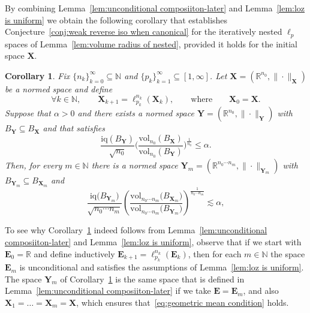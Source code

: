 \documentclass[11pt,reqno]{amsart}
\renewcommand{\le}{\leqslant}
\newcommand{\X}{\mathbf X}
\newcommand{\Y}{\mathbf Y}
\newcommand{\R}{\mathbb R}
\newtheorem{corollary}[theorem]{Corollary}
\theoremstyle{remark}
\newcommand{\iq}{\mathrm{iq}}
\renewcommand{\subset}{\subseteq}
\newcommand{\N}{\mathbb N}
\newcommand{\vol}{\mathrm{vol}}
\renewcommand{\1}{\mathbf 1}
\newcommand{\bfE}{\mathbf{E}}
\begin{document}
By combining Lemma~\ref{lem:unconditional composiiton-later}  and Lemma~\ref{lem:loz is uniform} we obtain the following corollary that establishes Conjecture~\ref{conj:weak reverse iso when canonical} for the iteratively nested $\ell_p$ spaces of Lemma~\ref{lem:volume radius of nested}, provided it holds for the initial space $\X$.



\begin{corollary}\label{lem:nested tensorization} Fix $\{n_k\}_{k=0}^\infty\subset  \N$ and $\{p_k\}_{k=1}^\infty\subset [1,\infty]$. Let $\X=(\R^{n_0},\|\cdot\|_\X)$ be a normed space and define
\begin{equation}\label{eq:nested lp def in intro}
\forall k\in \N, \qquad \X_{k+1}=\ell_{p_k}^{n_k}(\X_k), \qquad\mathrm{where}\qquad \X_0=\X.
\end{equation}
Suppose that $\alpha>0$ and there exists a normed space $\Y=(\R^{n_0},\|\cdot\|_\Y)$ with $B_\Y\subset B_\X$ and that satisfies
\begin{equation}\label{eq:n0 assumption}
\frac{\iq(B_\Y)}{\sqrt{n_0}}\bigg(\frac{\vol_{n_0}(B_\X)}{\vol_{n_0}(B_\Y)}\bigg)^{\frac{1}{n_0}}\le \alpha.
\end{equation}
Then, for every $m\in \N$ there is a normed space $\Y_m=(\R^{n_0\cdots n_m},\|\cdot\|_{\Y_m})$ with $B_{\Y_m}\subset B_{\X_m}$ and
$$
\frac{\iq\big(B_{\Y_m}\big)}{\sqrt{n_0\cdots n_m}}\left(\frac{\vol_{n_0\cdots n_m}\big(B_{\X_m}\big)}{\vol_{n_0\cdots n_m}\big(B_{\Y_m}\big)}\right)^{\frac{1}{n_0\cdots n_m}}\lesssim \alpha,
$$
\end{corollary}

To see why Corollary~\ref{lem:nested tensorization} indeed follows from Lemma~\ref{lem:unconditional composiiton-later}  and Lemma~\ref{lem:loz is uniform}, observe that if we start with $\bfE_0=\R$ and define inductively $\bfE_{k+1}=\ell_{p_k}^{n_k}(\bfE_k)$, then for each $m\in \N$ the space $\bfE_m$ is unconditional and satisfies the assumptions of Lemma~\ref{lem:loz is uniform}. The space $\Y_m$ of Corollary~\ref{lem:nested tensorization} is the same space that is defined in Lemma~\ref{lem:unconditional composiiton-later} if we take $\bfE=\bfE_m$, and also $\X_1=\ldots=\X_m=\X$, which ensures that~\eqref{eq:geometric mean condition} holds.
\end{document}
